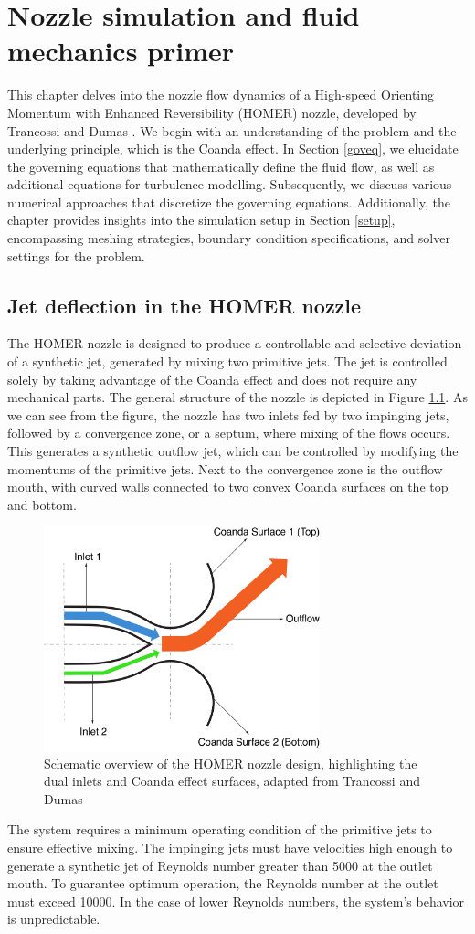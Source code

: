 \chapter{Nozzle simulation and fluid mechanics primer}
\label{chap:Theory-CFD}
This chapter delves into the nozzle flow dynamics of a High-speed Orienting Momentum with Enhanced Reversibility (HOMER) nozzle, developed by Trancossi and Dumas \cite{trandum}. We begin with an understanding of the problem and the underlying principle, which is the Coanda effect. In Section \ref{goveq}, we elucidate the governing equations that mathematically define the fluid flow, as well as additional equations for turbulence modelling. Subsequently, we discuss various numerical approaches that discretize the governing equations. Additionally, the chapter provides insights into the simulation setup in Section \ref{setup}, encompassing meshing strategies, boundary condition specifications, and solver settings for the problem. 
\section{Jet deflection in the HOMER nozzle}  
The HOMER nozzle is designed to produce a controllable and selective deviation of a synthetic jet, generated by mixing two primitive jets. The jet is controlled solely by taking advantage of the Coanda effect and does not require any mechanical parts. The general structure of the nozzle is depicted in Figure \ref{fig:nozzle}. As we can see from the figure, the nozzle has two inlets fed by two impinging jets, followed by a convergence zone, or a septum, where mixing of the flows occurs. This generates a synthetic outflow jet, which can be controlled by modifying the momentums of the primitive jets. Next to the convergence zone is the outflow mouth, with curved walls connected to two convex Coanda surfaces on the top and bottom.
\begin{figure}[ht]
  \centering
  \includegraphics[width=8cm]{images/Theory-CFD/nozzle.png}
  \caption{Schematic overview of the HOMER nozzle design, highlighting the dual inlets and Coanda effect surfaces, adapted from Trancossi and Dumas \cite{trandum}}
  \label{fig:nozzle}
\end{figure}
The system requires a minimum operating condition of the primitive jets \cite{trandum} to ensure effective mixing. The impinging jets must have velocities high enough to generate a synthetic jet of Reynolds number greater than 5000 at the outlet mouth. To guarantee optimum operation, the Reynolds number at the outlet must exceed 10000. In the case of lower Reynolds numbers, the system's behavior is unpredictable. 
